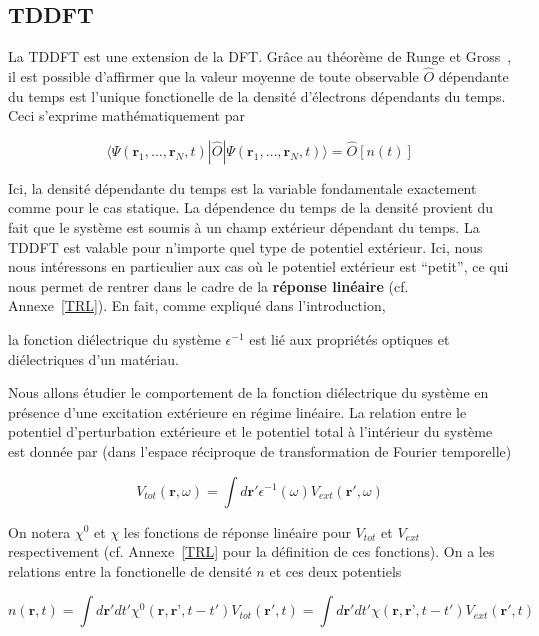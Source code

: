 \subsection{TDDFT}
La TDDFT est une extension de la DFT\@. Grâce au théorème de Runge et Gross~\cite{Runge1984}, il est possible d'affirmer que la valeur moyenne de toute observable $\hat{O}$ dépendante du temps est l'unique fonctionelle de la densité d'électrons dépendants du temps. Ceci s'exprime mathématiquement par

$$
\langle \Psi (\textbf{r}_1, \ldots, \textbf{r}_N, t) | \hat{O} | \Psi (\textbf{r}_1, \ldots, \textbf{r}_N, t) \rangle = \hat{O}[n(t)]
$$

Ici, la densité dépendante du temps est la variable fondamentale exactement comme pour le cas statique. La dépendence du temps de la densité provient du fait que le système est soumis à un champ extérieur dépendant du temps. La TDDFT est valable pour n'importe quel type de potentiel extérieur. Ici, nous nous intéressons en particulier aux cas où le potentiel extérieur est ``petit'', ce qui nous permet de rentrer dans le cadre de la \textbf{réponse linéaire} (cf. Annexe~\ref{TRL}). En fait, comme expliqué dans l'introduction,


la fonction diélectrique du système $\epsilon^{-1}$ est lié aux propriétés optiques et diélectriques d'un matériau.

Nous allons étudier le comportement de la fonction diélectrique du système en présence d'une excitation extérieure en régime linéaire. La relation entre le potentiel d'perturbation extérieure et le potentiel total à l'intérieur du système est donnée par (dans l'espace réciproque de transformation de Fourier temporelle)

\begin{equation}\label{VtotVext}
V_{tot}(\textbf{r}, \omega) = \int d\textbf{r}' \epsilon^{-1}(\omega) V_{ext}(\textbf{r}', \omega)
\end{equation}

On notera $\chi^0$ et $\chi$ les fonctions de réponse linéaire pour $V_{tot}$ et $V_{ext}$ respectivement (cf. Annexe~\ref{TRL} pour la définition de ces fonctions). On a les relations entre la fonctionelle de densité $n$ et ces deux potentiels

$$
n(\textbf{r}, t) = \int d\textbf{r}' dt' \chi^0(\textbf{r}, \textbf{r'}, t-t') V_{tot}(\textbf{r}', t) = \int d\textbf{r}' dt' \chi(\textbf{r}, \textbf{r'}, t-t') V_{ext}(\textbf{r}', t)
$$

